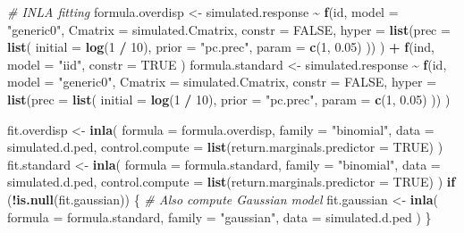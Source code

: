 \documentclass[
]{article}
\newenvironment{Shaded}{\begin{snugshade}}{\end{snugshade}}
\newcommand{\AttributeTok}[1]{\textcolor[rgb]{0.13,0.29,0.53}{#1}}
\newcommand{\CommentTok}[1]{\textcolor[rgb]{0.56,0.35,0.01}{\textit{#1}}}
\newcommand{\ConstantTok}[1]{\textcolor[rgb]{0.56,0.35,0.01}{#1}}
\newcommand{\ControlFlowTok}[1]{\textcolor[rgb]{0.13,0.29,0.53}{\textbf{#1}}}
\newcommand{\DecValTok}[1]{\textcolor[rgb]{0.00,0.00,0.81}{#1}}
\newcommand{\FloatTok}[1]{\textcolor[rgb]{0.00,0.00,0.81}{#1}}
\newcommand{\FunctionTok}[1]{\textcolor[rgb]{0.13,0.29,0.53}{\textbf{#1}}}
\newcommand{\NormalTok}[1]{#1}
\newcommand{\OtherTok}[1]{\textcolor[rgb]{0.56,0.35,0.01}{#1}}
\newcommand{\SpecialCharTok}[1]{\textcolor[rgb]{0.81,0.36,0.00}{\textbf{#1}}}
\newcommand{\StringTok}[1]{\textcolor[rgb]{0.31,0.60,0.02}{#1}}
\begin{document}
\begin{Shaded}
\begin{Highlighting}[]
  \CommentTok{\# INLA fitting}
\NormalTok{  formula.overdisp }\OtherTok{\textless{}{-}}\NormalTok{ simulated.response }\SpecialCharTok{\textasciitilde{}} \FunctionTok{f}\NormalTok{(id,}
    \AttributeTok{model =} \StringTok{"generic0"}\NormalTok{, }\AttributeTok{Cmatrix =}\NormalTok{ simulated.Cmatrix,}
    \AttributeTok{constr =} \ConstantTok{FALSE}\NormalTok{,}
    \AttributeTok{hyper =} \FunctionTok{list}\NormalTok{(}\AttributeTok{prec =} \FunctionTok{list}\NormalTok{(}
      \AttributeTok{initial =} \FunctionTok{log}\NormalTok{(}\DecValTok{1} \SpecialCharTok{/} \DecValTok{10}\NormalTok{), }\AttributeTok{prior =} \StringTok{"pc.prec"}\NormalTok{,}
      \AttributeTok{param =} \FunctionTok{c}\NormalTok{(}\DecValTok{1}\NormalTok{, }\FloatTok{0.05}\NormalTok{)}
\NormalTok{    ))}
\NormalTok{  ) }\SpecialCharTok{+}
    \FunctionTok{f}\NormalTok{(ind,}
      \AttributeTok{model =} \StringTok{"iid"}\NormalTok{, }\AttributeTok{constr =} \ConstantTok{TRUE}
\NormalTok{    )}
\NormalTok{  formula.standard }\OtherTok{\textless{}{-}}\NormalTok{ simulated.response }\SpecialCharTok{\textasciitilde{}} \FunctionTok{f}\NormalTok{(id,}
    \AttributeTok{model =} \StringTok{"generic0"}\NormalTok{, }\AttributeTok{Cmatrix =}\NormalTok{ simulated.Cmatrix,}
    \AttributeTok{constr =} \ConstantTok{FALSE}\NormalTok{,}
    \AttributeTok{hyper =} \FunctionTok{list}\NormalTok{(}\AttributeTok{prec =} \FunctionTok{list}\NormalTok{(}
      \AttributeTok{initial =} \FunctionTok{log}\NormalTok{(}\DecValTok{1} \SpecialCharTok{/} \DecValTok{10}\NormalTok{), }\AttributeTok{prior =} \StringTok{"pc.prec"}\NormalTok{,}
      \AttributeTok{param =} \FunctionTok{c}\NormalTok{(}\DecValTok{1}\NormalTok{, }\FloatTok{0.05}\NormalTok{)}
\NormalTok{    ))}
\NormalTok{  )}


\NormalTok{  fit.overdisp }\OtherTok{\textless{}{-}} \FunctionTok{inla}\NormalTok{(}
    \AttributeTok{formula =}\NormalTok{ formula.overdisp, }\AttributeTok{family =} \StringTok{"binomial"}\NormalTok{,}
    \AttributeTok{data =}\NormalTok{ simulated.d.ped,}
    \AttributeTok{control.compute =} \FunctionTok{list}\NormalTok{(}\AttributeTok{return.marginals.predictor =} \ConstantTok{TRUE}\NormalTok{)}
\NormalTok{  )}
\NormalTok{  fit.standard }\OtherTok{\textless{}{-}} \FunctionTok{inla}\NormalTok{(}
    \AttributeTok{formula =}\NormalTok{ formula.standard, }\AttributeTok{family =} \StringTok{"binomial"}\NormalTok{,}
    \AttributeTok{data =}\NormalTok{ simulated.d.ped,}
    \AttributeTok{control.compute =} \FunctionTok{list}\NormalTok{(}\AttributeTok{return.marginals.predictor =} \ConstantTok{TRUE}\NormalTok{)}
\NormalTok{  )}
  \ControlFlowTok{if}\NormalTok{ (}\SpecialCharTok{!}\FunctionTok{is.null}\NormalTok{(fit.gaussian)) \{}
    \CommentTok{\# Also compute Gaussian model}
\NormalTok{    fit.gaussian }\OtherTok{\textless{}{-}} \FunctionTok{inla}\NormalTok{(}
      \AttributeTok{formula =}\NormalTok{ formula.standard, }\AttributeTok{family =} \StringTok{"gaussian"}\NormalTok{,}
      \AttributeTok{data =}\NormalTok{ simulated.d.ped}
\NormalTok{    )}
\NormalTok{  \}}



\end{Highlighting}
\end{Shaded}
\end{document}
